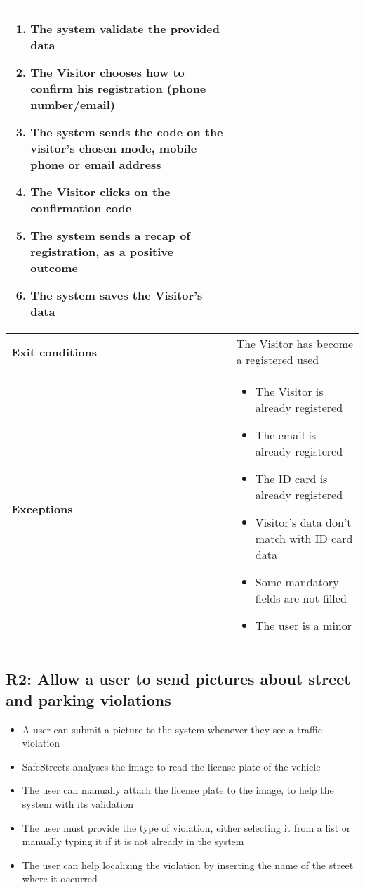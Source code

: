 \begin{description}
\begin{center}
\begin{tabular}{|p{3cm}|p{7cm}|}
\begin{enumerate}
                \item The system validate the provided data 
                \item The Visitor chooses how to confirm his registration (phone number/email) 
                \item The system sends the code on the visitor's chosen mode, mobile phone or email address
                \item The Visitor clicks on the confirmation code
                \item The system sends a recap of registration, as a positive outcome 
                \item The system saves the Visitor's data
            \end{enumerate} \\
            \hline
            \textbf{Exit conditions} & The Visitor has become a registered used \\
            \hline
            \textbf{Exceptions}
            & \begin{itemize}
                \item The Visitor is already registered
                \item The email is already registered
                \item The ID card is already registered 
                \item Visitor's data don't match with ID card data
                \item Some mandatory fields are not filled 
                \item The user is a minor
            \end{itemize} \\
            \hline
        \end{tabular}
    \end{center}
\end{description}

\subsection{R2: Allow a user to send pictures about street and parking violations}
\begin{itemize}
    \item A user can submit a picture to the system whenever they see a traffic violation
    \item SafeStreets analyses the image to read the license plate of the vehicle
    \item The user can manually attach the license plate to the image, to help the system with its validation
    \item The user must provide the type of violation, either selecting it from a list or manually typing it if it is not already in the system
    \item The user can help localizing the violation by inserting the name of the street where it occurred
\end{itemize}


